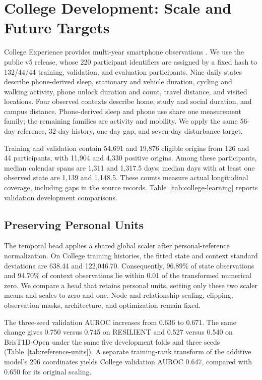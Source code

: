 \section{College Development: Scale and Future Targets}
\label{sec:college-development}

College Experience provides multi-year smartphone observations \citep{hneD08}. We use the public v5 release, whose 220 participant identifiers are assigned by a fixed hash to 132/44/44 training, validation, and evaluation participants. Nine daily states describe phone-derived sleep, stationary and vehicle duration, cycling and walking activity, phone unlock duration and count, travel distance, and visited locations. Four observed contexts describe home, study and social duration, and campus distance. Phone-derived sleep and phone use share one measurement family; the remaining families are activity and mobility. We apply the same 56-day reference, 32-day history, one-day gap, and seven-day disturbance target.

Training and validation contain 54,691 and 19,876 eligible origins from 126 and 44 participants, with 11,904 and 4,330 positive origins. Among these participants, median calendar spans are 1,311 and 1,317.5 days; median days with at least one observed state are 1,139 and 1,148.5. These counts measure actual longitudinal coverage, including gaps in the source records. Table~\ref{tab:college-learning} reports validation development comparisons.

\subsection{Preserving Personal Units}
The temporal head applies a shared global scaler after personal-reference normalization. On College training histories, the fitted state and context standard deviations are 638.44 and 122,046.70. Consequently, 96.89\% of state observations and 94.70\% of context observations lie within 0.01 of the transformed numerical zero. We compare a head that retains personal units, setting only these two scaler means and scales to zero and one. Node and relationship scaling, clipping, observation masks, architecture, and optimization remain fixed.

The three-seed validation AUROC increases from 0.636 to 0.671. The same change gives 0.750 versus 0.745 on RESILIENT and 0.527 versus 0.540 on BrisT1D-Open under the same five development folds and three seeds (Table~\ref{tab:reference-units}). A separate training-rank transform of the additive model's 296 coordinates yields College validation AUROC 0.647, compared with 0.650 for its original scaling.

